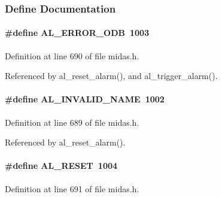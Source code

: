 \subsubsection{Define Documentation}
\paragraph[{AL\_\-ERROR\_\-ODB}]{\setlength{\rightskip}{0pt plus 5cm}\#define AL\_\-ERROR\_\-ODB~1003}\hfill\label{group__err26_gae85455d8748ca9ad9c652365f4030178}

\begin{DoxyItemize}
\item 
\end{DoxyItemize}

Definition at line 690 of file midas.h.

Referenced by al\_\-reset\_\-alarm(), and al\_\-trigger\_\-alarm().
\paragraph[{AL\_\-INVALID\_\-NAME}]{\setlength{\rightskip}{0pt plus 5cm}\#define AL\_\-INVALID\_\-NAME~1002}\hfill\label{group__err26_ga55849da05eeaa784af7a8b0969b6cab8}

\begin{DoxyItemize}
\item 
\end{DoxyItemize}

Definition at line 689 of file midas.h.

Referenced by al\_\-reset\_\-alarm().
\paragraph[{AL\_\-RESET}]{\setlength{\rightskip}{0pt plus 5cm}\#define AL\_\-RESET~1004}\hfill\label{group__err26_ga6fb127cb253f60659e9356f9eeff2107}

\begin{DoxyItemize}
\item 
\end{DoxyItemize}

Definition at line 691 of file midas.h.

